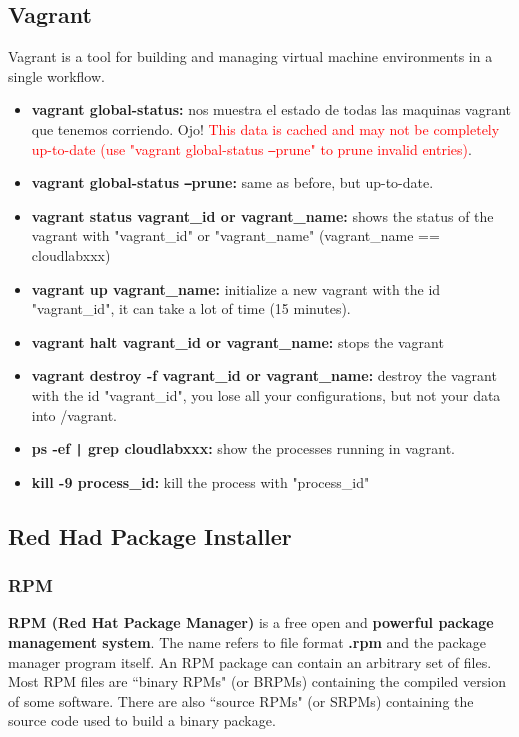 \documentclass{article}
\begin{document}
\subsection{Vagrant}
Vagrant is a tool for building and managing virtual machine environments in a single workflow.

\begin{itemize}
    \item \textbf{vagrant global-status:} nos muestra el estado de todas las maquinas vagrant que tenemos corriendo. Ojo! \textcolor{red}{This data is cached and may not be completely up-to-date (use "vagrant global-status \texttt{--}prune" to prune invalid entries)}.
    \item \textbf{vagrant global-status \texttt{--}prune:} same as before, but up-to-date.
   \item \textbf{vagrant status vagrant\_id or vagrant\_name:} shows the status of the vagrant with "vagrant\_id" or "vagrant\_name" (vagrant\_name == cloudlabxxx)
   \item \textbf{vagrant up vagrant\_name:} initialize a new vagrant with the id "vagrant\_id", it can take a lot of time (15 minutes).
   \item \textbf{vagrant halt vagrant\_id or vagrant\_name:} stops the vagrant
   \item \textbf{vagrant destroy -f vagrant\_id or vagrant\_name:} destroy the vagrant with the id "vagrant\_id", you lose all your configurations, but not your data into /vagrant.
   \item \textbf{ps -ef \texttt{|} grep cloudlabxxx:} show the processes running in vagrant.
   \item \textbf{kill -9 process\_id:} kill the process with "process\_id"
\end{itemize}

\subsection{Red Had Package Installer}
\subsubsection{RPM}
\textbf{RPM (Red Hat Package Manager)} is a free open and \textbf{powerful package management system}. The name refers to file format \textbf{.rpm} and the package manager program itself. An RPM package can contain an arbitrary set of files. Most RPM files are “binary RPMs" (or BRPMs) containing the compiled version of some software. There are also “source RPMs" (or SRPMs) containing the source code used to build a binary package.
\end{document}
